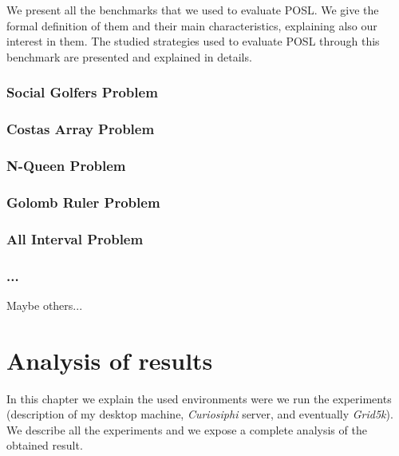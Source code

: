\documentclass[a4paper]{book} %
\newcommand{\posl}{{\sc POSL}}
\begin{document}
We present all the benchmarks that we used to evaluate \posl{}. We give the formal definition of them and their main characteristics, explaining also our interest in them. The studied strategies used to evaluate \posl{} through this benchmark are presented and explained in details.

\subsection{Social Golfers Problem}


\subsection{Costas Array Problem}


\subsection{N-Queen Problem}


\subsection{Golomb Ruler Problem}


\subsection{All Interval Problem}


\subsection{...}

Maybe others...

\chapter{Analysis of results}

In this chapter we explain the used environments were we run the experiments (description of my desktop machine, \textit{Curiosiphi} server, and eventually \textit{Grid5k}). We describe all the experiments and we expose a complete analysis of the obtained result.
\end{document}
